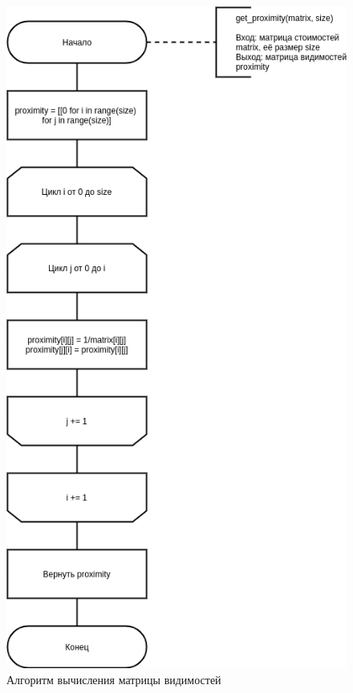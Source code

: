 \begin{figure}[H]
	\begin{center}
		\includegraphics[scale=0.5]{img/proximity.png}
	\end{center}
	\captionsetup{justification=centering}
	\caption{Алгоритм вычисления матрицы видимостей}
	\label{img:proximity}
\end{figure}

